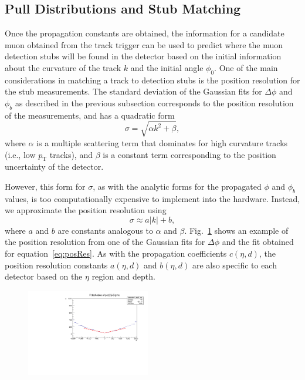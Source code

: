 \subsection{Pull Distributions and Stub Matching}
\label{subsec:pulls}

Once the propagation constants are obtained, the information for a candidate muon obtained from the track trigger can be used to predict where the muon detection stubs will be found in the detector based on the initial information about the curvature of the track $k$ and the initial angle $\phi_0$.
One of the main considerations in matching a track to detection stubs is the position resolution for the stub measurements.
The standard deviation of the Gaussian fits for $\Delta\phi$ and $\phi_b$ as described in the previous subsection corresponds to the position resolution of the measurements, and has a quadratic form
\begin{equation}
  \sigma=\sqrt{\alpha k^2+\beta},
\end{equation}
where $\alpha$ is a multiple scattering term that dominates for high curvature tracks (i.e., low $p_\mathrm{T}$ tracks), and $\beta$ is a constant term corresponding to the position uncertainty of the detector.

However, this form for $\sigma$, as with the analytic forms for the propagated $\phi$ and $\phi_b$ values, is too computationally expensive to implement into the hardware.
Instead, we approximate the position resolution using
\begin{equation}\label{eq:posRes}
  \sigma\approx a|k|+b,
\end{equation}
where $a$ and $b$ are constants analogous to $\alpha$ and $\beta$.
Fig.~\ref{fig:deltaPhiRes} shows an example of the position resolution from one of the Gaussian fits for $\Delta\phi$ and the fit obtained for equation~\ref{eq:posRes}.
As with the propagation coefficients $c(\eta,d)$, the position resolution constants $a(\eta,d)$ and $b(\eta,d)$ are also specific to each detector based on the $\eta$ region and depth.

\begin{figure}[htbp]
  \centering
  \includegraphics[width=0.48\textwidth]{fig/TPS/deltaPhi_res.pdf}
  \caption{}
  \label{fig:deltaPhiRes}
\end{figure}

